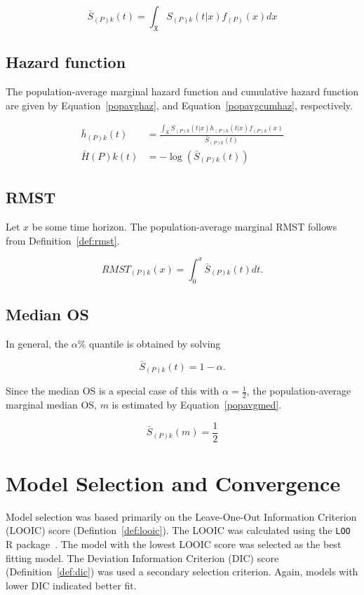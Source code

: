 \begin{equation}
    \bar{S}_{(P)k}(t) = \int_{\mathfrak{X}}S_{(P)k}(t|x)f_{(P)}(x)dx
    \label{popavgS}
\end{equation}

\subsection{Hazard function}

The population-average marginal hazard function and cumulative hazard function are given by Equation~\ref{popavghaz}, and Equation~\ref{popavgcumhaz}, respectively.

\begin{align}
    \bar{h}_{(P)k}(t) &= \frac{\int_{\mathfrak{X}}S_{(P)k}(t|x)h_{(P)k}(t|x)f_{(P)k}(x)}{\bar{S}_{(P)k}(t)} \label{popavghaz}\\
    \bar{H}{(P)k}(t) &= -\log(\bar{S}_{(P)k}(t)) \label{popavgcumhaz}
\end{align}

\subsection{RMST}
Let $x$ be some time horizon. The population-average marginal RMST follows from Definition~\ref{def:rmst}.

\begin{equation}
    RMST_{(P)k}(x) = \int^{x}_{0} \bar{S}_{(P)k}(t)dt.
\end{equation}

\subsection{Median OS}
In general, the $\alpha\%$ quantile is obtained by solving

\begin{equation}
    \bar{S}_{(P)k}(t) = 1 - \alpha.
\end{equation}

Since the median OS is a special case of this with $\alpha = \frac{1}{2}$, the population-average marginal median OS, $m$ is estimated by Equation~\ref{popavgmed}. 

\begin{equation}
    \bar{S}_{(P)k}(m) = \frac{1}{2}
    \label{popavgmed}
\end{equation}

\section{Model Selection and Convergence}
Model selection was based primarily on the Leave-One-Out Information Criterion (LOOIC) score (Defintion~\ref{def:looic}). The LOOIC was calculated using the \verb|LOO| R package~\cite{loo}. The model with the lowest LOOIC score was selected as the best fitting model. The Deviation Information Criterion (DIC) score (Definition~\ref{def:dic}) was used a secondary selection criterion. Again, models with lower DIC indicated better fit. \\

